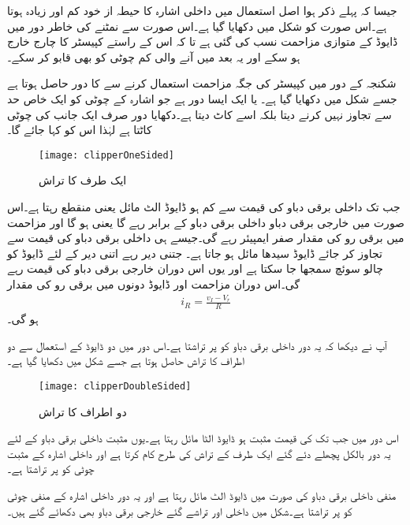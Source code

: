 جیسا کہ پہلے ذکر ہوا اصل استعمال میں داخلی اشارہ کا حیطہ از خود کم اور زیادہ ہوتا ہے۔اس صورت کو شکل میں دکھایا گیا ہے۔اس صورت سے نمٹنے کی خاطر دور میں ڈایوڈ کے متوازی مزاحمت  نسب کی گئی ہے تا کہ اس کے راستے کپیسٹر کا چارج خارج ہو سکے اور یہ بعد میں آنے والی کم چوٹی کو بھی قابو کر سکے۔



شکنجہ کے دور میں کپیسٹر کی جگہ مزاحمت استعمال کرنے سے   کا دور حاصل ہوتا ہے جسے شکل  میں دکھایا گیا ہے۔ یا  ایک ایسا دور ہے جو اشارہ کے چوٹی کو ایک خاص حد سے تجاوز نہیں کرنے دیتا بلکہ اسے کاٹ دیتا ہے۔دکھایا دور صرف ایک جانب کی چوٹی کاٹتا ہے لہٰذا اس کو  کہا جائے گا۔
 \begin{figure}
\centering
\texttt{[image: clipperOneSided]}
\caption{ایک طرف کا تراش}
\label{شکل_ایک_طرف_کا_تراش}
\end{figure}
جب تک داخلی برقی دباو کی قیمت  سے کم ہو ڈایوڈ الٹ مائل یعنی منقطع رہتا ہے۔اس صورت میں خارجی برقی دباو داخلی برقی دباو کے برابر رہے گا یعنی ہو گا اور مزاحمت   میں برقی رو کی مقدار صفر ایمپیئر رہے گی۔جیسے ہی داخلی برقی دباو  کی قیمت  سے تجاوز کر جائے ڈایوڈ سیدھا مائل ہو جاتا ہے۔ جتنی دیر   رہے اتنی دیر کے لئے  ڈایوڈ کو چالو سوئچ سمجھا جا سکتا ہے اور یوں اس دوران خارجی برقی دباو کی قیمت  رہے گی۔اس دوران مزاحمت اور ڈایوڈ دونوں میں برقی رو کی مقدار
\begin{align*}
i_R=\frac{v_I-V_r}{R}
\end{align*}
ہو گی۔

آپ نے دیکھا کہ یہ دور داخلی برقی دباو کو  پر تراشتا ہے۔اس دور میں دو ڈایوڈ کے استعمال سے دو اطراف کا تراش حاصل ہوتا ہے جسے شکل   میں دکھایا گیا ہے۔
\begin{figure}
\centering
\texttt{[image: clipperDoubleSided]}
\caption{دو اطراف کا تراش}
\label{شکل_دو_اطراف_کا_تراش}
\end{figure}
اس دور میں جب تک  کی قیمت مثبت ہو ڈایوڈ  الٹا مائل رہتا ہے۔یوں مثبت داخلی برقی دباو کے لئے یہ دور بالکل پچھلے دئے گئے ایک طرف کے تراش کی طرح کام کرتا ہے اور داخلی اشارہ کے مثبت چوٹی کو  پر تراشتا ہے۔

منفی داخلی برقی دباو کی صورت میں ڈایوڈ  الٹ مائل رہتا ہے اور یہ دور داخلی اشارہ کے منفی چوٹی کو  پر تراشتا ہے۔شکل میں داخلی اور تراشے گئے خارجی برقی دباو بھی دکھائے گئے ہیں۔

